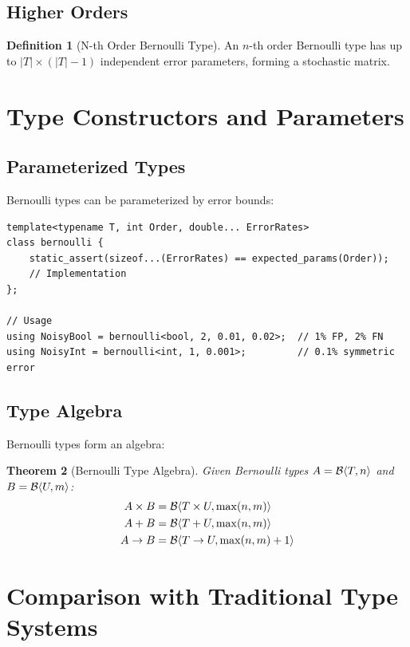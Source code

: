 \documentclass[11pt,twoside,openright]{book}
\theoremstyle{definition}
\newtheorem{definition}{Definition}[chapter]
\theoremstyle{plain}
\newtheorem{theorem}[definition]{Theorem}
\theoremstyle{remark}
\begin{document}
\subsection{Higher Orders}

\begin{definition}[N-th Order Bernoulli Type]
An $n$-th order Bernoulli type has up to $|T| \times (|T| - 1)$ independent error parameters, forming a stochastic matrix.
\end{definition}

\section{Type Constructors and Parameters}

\subsection{Parameterized Types}

Bernoulli types can be parameterized by error bounds:

\begin{verbatim}
template<typename T, int Order, double... ErrorRates>
class bernoulli {
    static_assert(sizeof...(ErrorRates) == expected_params(Order));
    // Implementation
};

// Usage
using NoisyBool = bernoulli<bool, 2, 0.01, 0.02>;  // 1% FP, 2% FN
using NoisyInt = bernoulli<int, 1, 0.001>;         // 0.1% symmetric error
\end{verbatim}

\subsection{Type Algebra}

Bernoulli types form an algebra:

\begin{theorem}[Bernoulli Type Algebra]
Given Bernoulli types $A = \mathcal{B}\langle T, n \rangle$ and $B = \mathcal{B}\langle U, m \rangle$:
\begin{align}
A \times B &= \mathcal{B}\langle T \times U, \max(n,m) \rangle \\
A + B &= \mathcal{B}\langle T + U, \max(n,m) \rangle \\
A \to B &= \mathcal{B}\langle T \to U, \max(n,m)+1 \rangle
\end{align}
\end{theorem}

\section{Comparison with Traditional Type Systems}
\end{document}
